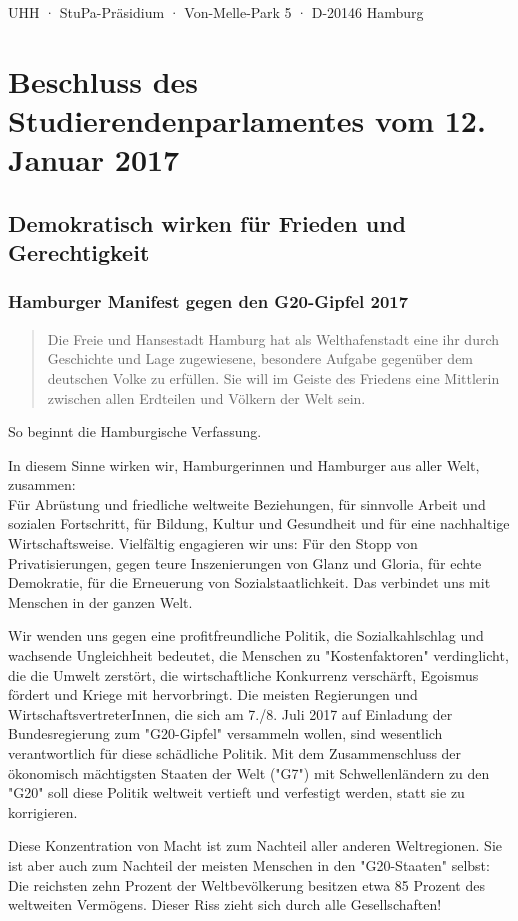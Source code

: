 \documentclass[ngerman,headheight=70pt]{scrartcl}
\begin{document}
    UHH · StuPa-Präsidium · Von-Melle-Park 5 · D-20146 Hamburg

    \section*{Beschluss des Studierendenparlamentes vom 12. Januar 2017}
    \subsection*{Demokratisch wirken für Frieden und Gerechtigkeit}
    \subsubsection*{Hamburger Manifest gegen den G20-Gipfel 2017}

    \blockquote{Die Freie und Hansestadt Hamburg hat als Welthafenstadt eine ihr
    durch Geschichte und Lage zugewiesene, besondere Aufgabe gegenüber dem
    deutschen Volke zu erfüllen. Sie will im Geiste des Friedens eine Mittlerin
    zwischen allen Erdteilen und Völkern der Welt sein.} So beginnt die
    Hamburgische Verfassung.

    In diesem Sinne wirken wir, Hamburgerinnen und Hamburger aus aller Welt,
    zusammen:\\
    Für Abrüstung und friedliche weltweite Beziehungen, für sinnvolle Arbeit und
    sozialen Fortschritt, für Bildung, Kultur und Gesundheit und für eine
    nachhaltige Wirtschaftsweise. Vielfältig engagieren wir uns: Für den Stopp
    von Privatisierungen, gegen teure Inszenierungen von Glanz und Gloria, für
    echte Demokratie, für die Erneuerung von Sozialstaatlichkeit. Das verbindet
    uns mit Menschen in der ganzen Welt.

    Wir wenden uns gegen eine profitfreundliche Politik, die Sozialkahlschlag und
    wachsende Ungleichheit bedeutet, die Menschen zu "Kostenfaktoren" verdinglicht,
    die die Umwelt zerstört, die wirtschaftliche Konkurrenz verschärft, Egoismus
    fördert und Kriege mit hervorbringt. Die meisten Regierungen und
    WirtschaftsvertreterInnen, die sich am 7./8. Juli 2017 auf Einladung der
    Bundesregierung zum "G20-Gipfel" versammeln wollen, sind wesentlich
    verantwortlich für diese schädliche Politik. Mit dem Zusammenschluss der
    ökonomisch mächtigsten Staaten der Welt ("G7") mit Schwellenländern zu den
    "G20" soll diese Politik weltweit vertieft und verfestigt werden, statt sie
    zu korrigieren.

    Diese Konzentration von Macht ist zum Nachteil aller anderen Weltregionen.
    Sie ist aber auch zum Nachteil der meisten Menschen in den "G20-Staaten"
    selbst: Die reichsten zehn Prozent der Weltbevölkerung besitzen etwa 85
    Prozent des weltweiten Vermögens. Dieser Riss zieht sich durch alle
    Gesellschaften!
\end{document}
